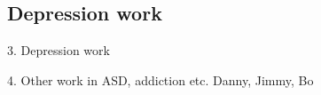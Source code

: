 \documentclass{article}
\begin{document}
\subsection{Depression work}

3. Depression work

4. Other work in ASD, addiction etc. 
Danny, Jimmy, Bo
\vfill\pagebreak



\end{document}
